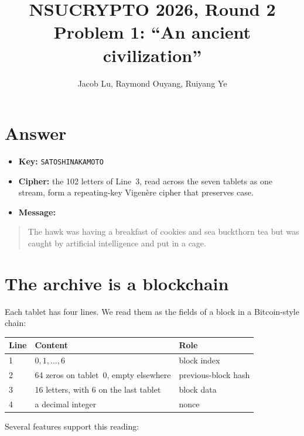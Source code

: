 \documentclass[11pt,a4paper]{article}
\title{NSUCRYPTO 2026, Round 2\\Problem 1: ``An ancient civilization''}
\date{}
\author{Jacob Lu, Raymond Ouyang, Ruiyang Ye}
\newcommand{\tx}[1]{\texttt{#1}}
\begin{document}
\maketitle

\section*{Answer}

\begin{itemize}
  \item \textbf{Key:} \tx{SATOSHINAKAMOTO}
  \item \textbf{Cipher:} the 102 letters of Line~3, read across the seven tablets as one stream, form a repeating-key Vigen\`ere cipher that preserves case.
  \item \textbf{Message:}
\end{itemize}

\begin{quote}
The hawk was having a breakfast of cookies and sea buckthorn tea but was
caught by artificial intelligence and put in a cage.
\end{quote}

\section{The archive is a blockchain}

Each tablet has four lines. We read them as the fields of a block in a
Bitcoin-style chain:

\begin{center}
\begin{tabular}{@{}lll@{}}
\toprule
Line & Content & Role \\
\midrule
1 & $0,1,\dots,6$ & block index \\
2 & 64 zeros on tablet~0, empty elsewhere & previous-block hash \\
3 & 16 letters, with 6 on the last tablet & block data \\
4 & a decimal integer & nonce \\
\bottomrule
\end{tabular}
\end{center}

Several features support this reading:
\end{document}
